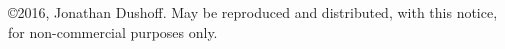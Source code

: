 \copyright 2016, Jonathan Dushoff.  May be reproduced and distributed, with this notice, for non-commercial purposes only.
